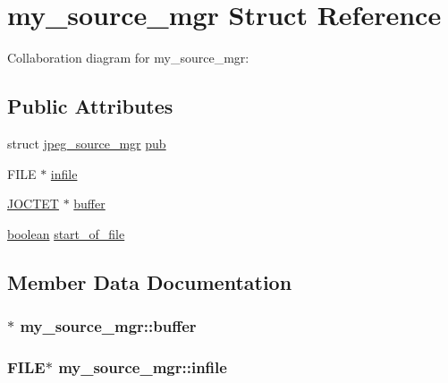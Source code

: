 \hypertarget{structmy__source__mgr}{}\section{my\+\_\+source\+\_\+mgr Struct Reference}
\label{structmy__source__mgr}


Collaboration diagram for my\+\_\+source\+\_\+mgr\+:
\subsection*{Public Attributes}
\begin{DoxyCompactItemize}
\item 
struct \hyperlink{structjpeg__source__mgr}{jpeg\+\_\+source\+\_\+mgr} \hyperlink{structmy__source__mgr_a8572f33f87bec948592001edea12680f}{pub}
\item 
F\+I\+L\+E $\ast$ \hyperlink{structmy__source__mgr_a157a49dcdfd5723e566b1b8a35394a04}{infile}
\item 
\hyperlink{jmorecfg_8h_a356ad249f20e691b520da439f92cccbc}{J\+O\+C\+T\+E\+T} $\ast$ \hyperlink{structmy__source__mgr_ab92bf51a7ca44e0d3909aeb21fb0b0f8}{buffer}
\item 
\hyperlink{jmorecfg_8h_a7c6368b321bd9acd0149b030bb8275ed}{boolean} \hyperlink{structmy__source__mgr_a5c505c9008db53bb3ce07ed8ae3872a9}{start\+\_\+of\+\_\+file}
\end{DoxyCompactItemize}


\subsection{Member Data Documentation}
\hypertarget{structmy__source__mgr_ab92bf51a7ca44e0d3909aeb21fb0b0f8}{}
\subsubsection[{buffer}]{$\ast$ my\+\_\+source\+\_\+mgr\+::buffer}\label{structmy__source__mgr_ab92bf51a7ca44e0d3909aeb21fb0b0f8}
\hypertarget{structmy__source__mgr_a157a49dcdfd5723e566b1b8a35394a04}{}
\subsubsection[{infile}]{\setlength{\rightskip}{0pt plus 5cm}F\+I\+L\+E$\ast$ my\+\_\+source\+\_\+mgr\+::infile}\label{structmy__source__mgr_a157a49dcdfd5723e566b1b8a35394a04}
\hypertarget{structmy__source__mgr_a8572f33f87bec948592001edea12680f}{}

